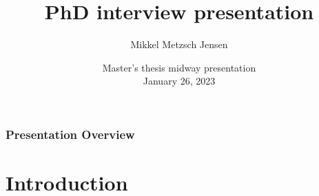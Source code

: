 \documentclass[
	10pt, %
]{beamer}
\title[PhD interview presentation]{PhD interview presentation} %
\author[Mikkel Metzsch Jensen]{Mikkel Metzsch Jensen} %
\institute[UiO]{University of Oslo} %
\date[\today]{Master's thesis midway presentation \\ January 26, 2023} %
\begin{document}

\begin{frame}
	\titlepage %
\end{frame}



\begin{frame}
	\frametitle{Presentation Overview} %
	
	\tableofcontents %
\end{frame}



\section{Introduction}
\end{document}
